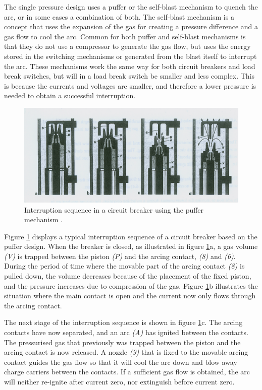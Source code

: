 \documentclass[10pt,b5paper,twoside]{article}
\begin{document}
The single pressure design uses a puffer or the self-blast mechanism to quench the arc, or in some cases a combination of both. The self-blast mechanism is a concept that uses the expansion of the gas for creating a pressure difference and a gas flow to cool the arc. Common for both puffer and self-blast mechanisms is that they do not use a compressor to generate the gas flow, but uses the energy stored in the switching mechanisms or generated from the blast itself to interrupt the arc. These mechanisms work the same way for both circuit breakers and load break switches, but will in a load break switch be smaller and less complex. This is because the currents and voltages are smaller, and therefore a lower pressure is needed to obtain a successful interruption.

\begin{figure} [H]
\centering
\includegraphics[scale=0.75]{Bilder/Theory/CircutBreakPuff1.png}
\caption{Interruption sequence in a circuit breaker using the puffer mechanism \cite{bib:HVEbreak}.} \label{fig:CircutBreakPuff1}
\end{figure}

Figure \ref{fig:CircutBreakPuff1} displays a typical interruption sequence of a circuit breaker based on the puffer design. When the breaker is closed, as illustrated in figure \ref{fig:CircutBreakPuff1}a, a gas volume \textit{(V)} is trapped between the piston \textit{(P)} and the arcing contact, \textit{(8)} and \textit{(6)}. During the period of time where the movable part of the arcing contact \textit{(8)} is pulled down, the volume decreases because of the placement of the fixed piston, and the pressure increases due to compression of the gas. Figure \ref{fig:CircutBreakPuff1}b illustrates the situation where the main contact is open and the current now only flows through the arcing contact.

The next stage of the interruption sequence is shown in figure \ref{fig:CircutBreakPuff1}c. The arcing contacts have now separated, and an arc \textit{(A)} has ignited between the contacts. The pressurised gas that previously was trapped between the piston and the arcing contact is now released. A nozzle \textit{(9)} that is fixed to the movable arcing contact guides the gas flow so that it will cool the arc down and blow away charge carriers between the contacts. If a sufficient gas flow is obtained, the arc will neither re-ignite after current zero, nor extinguish before current zero.
\end{document}

